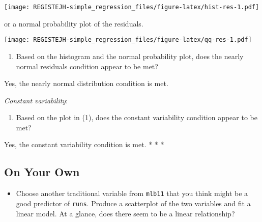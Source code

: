 \documentclass[
]{article}
\newenvironment{Shaded}{\begin{snugshade}}{\end{snugshade}}
\newcommand{\CommentTok}[1]{\textcolor[rgb]{0.56,0.35,0.01}{\textit{#1}}}
\newcommand{\DataTypeTok}[1]{\textcolor[rgb]{0.13,0.29,0.53}{#1}}
\newcommand{\KeywordTok}[1]{\textcolor[rgb]{0.13,0.29,0.53}{\textbf{#1}}}
\newcommand{\NormalTok}[1]{#1}
\newcommand{\OperatorTok}[1]{\textcolor[rgb]{0.81,0.36,0.00}{\textbf{#1}}}
\providecommand{\tightlist}{%
  \setlength{\itemsep}{0pt}\setlength{\parskip}{0pt}}
\begin{document}
\texttt{[image: REGISTEJH-simple\_regression\_files/figure-latex/hist-res-1.pdf]}

or a normal probability plot of the residuals.

\begin{Shaded}
\end{Shaded}

\texttt{[image: REGISTEJH-simple\_regression\_files/figure-latex/qq-res-1.pdf]}

\begin{enumerate}
\def\labelenumi{\arabic{enumi}.}
\setcounter{enumi}{6}
\tightlist
\item
  Based on the histogram and the normal probability plot, does the
  nearly normal residuals condition appear to be met?
\end{enumerate}

Yes, the nearly normal distribution condition is met.

\emph{Constant variability}:

\begin{enumerate}
\def\labelenumi{\arabic{enumi}.}
\setcounter{enumi}{7}
\tightlist
\item
  Based on the plot in (1), does the constant variability condition
  appear to be met?
\end{enumerate}

Yes, the constant variability condition is met. * * *

\hypertarget{on-your-own}{%
\subsection{On Your Own}\label{on-your-own}}

\begin{itemize}
\tightlist
\item
  Choose another traditional variable from \texttt{mlb11} that you think
  might be a good predictor of \texttt{runs}. Produce a scatterplot of
  the two variables and fit a linear model. At a glance, does there seem
  to be a linear relationship?
\end{itemize}

\begin{Shaded}
\end{Shaded}
\end{document}
